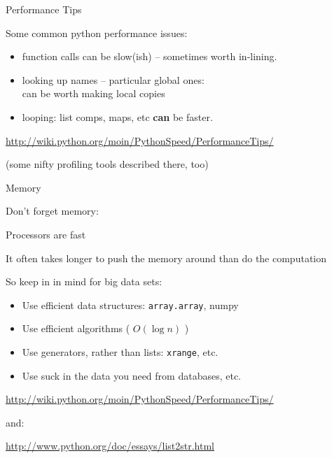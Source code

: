 \documentclass{beamer}
\begin{document}
\begin{frame}[fragile]{Performance Tips}

\vfill
{\Large Some common python performance issues:}

\begin{itemize}
  \item function calls can be slow(ish) -- sometimes worth in-lining.
  \item looking up names -- particular global ones:\\
        can be worth making local copies
  \item looping: list comps, maps, etc {\bf can} be faster.
\end{itemize}

\vfill
\url{http://wiki.python.org/moin/PythonSpeed/PerformanceTips/}

\vfill
(some nifty profiling tools described there, too)

\end{frame} 

\begin{frame}[fragile]{Memory}

\vfill
{\LARGE Don't forget memory:}

\vfill
{\Large Processors are fast}

\vfill
{\Large It often takes longer to push the memory around than do the computation}

\vfill
{\Large So keep in in mind for big data sets:}
\begin{itemize}
   \item Use efficient data structures: \verb|array.array|, numpy
   \item Use efficient algorithms ( $O( \log n )$ )
   \item Use generators, rather than lists: \verb|xrange|, etc.
   \item Use suck in the data you need from databases, etc.  
\end{itemize}


\vfill
\url{http://wiki.python.org/moin/PythonSpeed/PerformanceTips/}

and:

\url{http://www.python.org/doc/essays/list2str.html}

\end{frame} 
\end{document}
